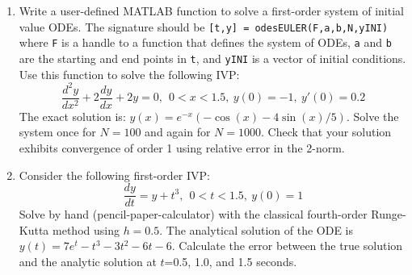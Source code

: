 \begin{fullwidth}
\begin{enumerate}
\item Write a user-defined MATLAB function to solve a first-order system of initial value ODEs.  The signature should be \lstinline[style=myMatlab]{[t,y] = odesEULER(F,a,b,N,yINI)} where \lstinline[style=myMatlab]{F} is a handle to a function that defines the system of ODEs, \lstinline[style=myMatlab]{a} and \lstinline[style=myMatlab]{b} are the starting and end points in \lstinline[style=myMatlab]{t}, and \lstinline[style=myMatlab]{yINI} is a vector of initial conditions.  Use this function to solve the following IVP:
\begin{equation*}
\frac{d^2y}{dx^2}+2\frac{dy}{dx} + 2y = 0, \ \ 0<x<1.5, \ y(0)=-1, \ y{\prime}(0) = 0.2
\end{equation*}
The exact solution is: $y(x) = e^{-x}\left(-\cos{(x)} - 4 \sin{(x)}/5\right)$.  Solve the system once for $N=100$ and again for $N=1000$.  Check that your solution exhibits convergence of order 1 using relative error in the 2-norm.

\vspace{1.0cm}

\item Consider the following first-order IVP:
\begin{equation*}
\frac{dy}{dt} = y + t^3, \ \ 0<t<1.5, \ y(0)=1
\end{equation*}
Solve by hand (pencil-paper-calculator) with the classical fourth-order Runge-Kutta method using $h=0.5$.  The analytical solution of the ODE is $y(t)=7e^{t}-t^3 -3t^2 - 6t-6$.  Calculate the error between the true solution and the analytic solution at $t$=0.5, 1.0, and 1.5 seconds.

\vspace{1.0cm}




\end{enumerate}
\end{fullwidth}
